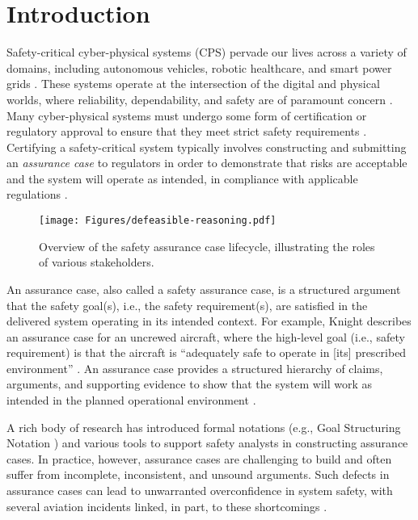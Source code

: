 \section{Introduction} 
\label{sec:introduction}

Safety-critical cyber-physical systems (CPS) pervade our lives across a variety of domains, including autonomous vehicles, robotic healthcare, and smart power grids \cite{gunes2014survey,dey2018medical,koopman2017autonomous}. These systems operate at the intersection of the digital and physical worlds, where reliability, dependability, and safety are of paramount concern \cite{hawkins2015weaving}. 
Many cyber-physical systems must undergo some form of certification or regulatory approval to ensure that they meet strict safety requirements \cite{johnson1998178b}. 
Certifying a safety-critical system typically involves constructing and submitting an \emph{assurance case} to regulators in order to demonstrate that risks are acceptable and the system will operate as intended, in compliance with applicable regulations \cite{bloomfield1998ascad}. 

\begin{figure}
    \centering
    \texttt{[image: Figures/defeasible-reasoning.pdf]}
    \caption{Overview of the safety assurance case lifecycle, %
    illustrating the roles of various stakeholders.}
    \label{fig:Defeasible}
\end{figure}

An assurance case, also called a safety assurance case, is a structured argument that the safety goal(s), i.e., the safety requirement(s), are satisfied in the delivered system operating in its intended context. For example, Knight describes an assurance case for an uncrewed aircraft, where the high-level goal (i.e., safety requirement) is that the aircraft is “adequately safe to operate in [its] prescribed environment” \cite{Knight12}. An assurance case provides a structured hierarchy of claims, arguments, and supporting evidence to show that the system will work as intended in the planned operational environment \cite{kelly2004goal,rushby2015interpretation,bloomfield2024defeaters}.

A rich body of research has introduced formal notations (e.g., Goal Structuring Notation \cite{kelly2004goal}) and various tools \cite{maksimov2019survey,10311213,denney2012advocate} to support safety analysts in constructing assurance cases. In practice, however, assurance cases are challenging to build and often suffer from incomplete, inconsistent, and unsound arguments. Such defects in assurance cases can lead to unwarranted overconfidence in system safety, with several aviation incidents linked, in part, to these shortcomings \cite{cave2006independent}.

